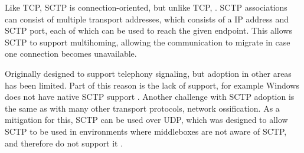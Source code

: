 Like TCP, SCTP is connection-oriented, but unlike TCP,
 \cite{leungMultihomedCommunicationSCTP2013}.
SCTP associations can consist of multiple transport addresses,
which consists of a IP address and SCTP port, each of which
can be used to reach the given endpoint. This allows SCTP to
support multihoming, allowing the communication to migrate
in case one connection becomes unavailable.

Originally designed to support telephony signaling, but
adoption in other areas has been limited. Part of
this reason is the lack of support, for example Windows does
not have native SCTP support \cite{hoggWhatStreamControl}.
Another challenge with SCTP adoption is the same as with
many other transport protocols, network ossification.
As a mitigation for this, SCTP can be used over UDP, which
was designed to allow SCTP to be used in environments
where middleboxes are not aware of SCTP, and therefore
do not support it \cite{tuexenUDPEncapsulationStream2013}.
